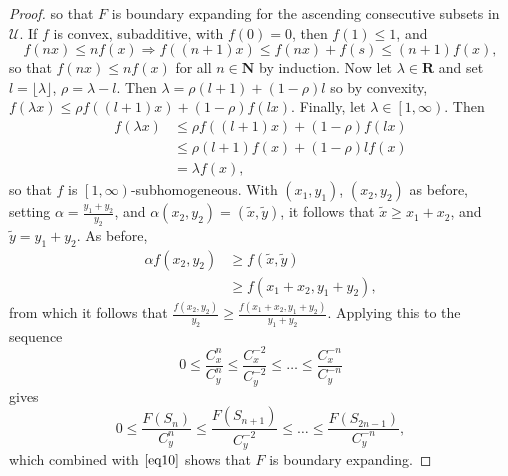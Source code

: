 \documentclass{article}
\theoremstyle{case}
\begin{document}
\begin{proof}
so that $F$ is boundary expanding for the ascending consecutive subsets in $\mathcal{U}$. If $f$ is convex, subadditive, with $f(0) = 0$, then $f(1) \leq 1$, and 
\[
f(nx) \leq nf(x) \Rightarrow f((n+1)x) \leq f(nx) + f(s) \leq (n+1)f(x),
\]
so that $f(nx) \leq nf(x)$ for all $n \in \mathbf{N}$ by induction. Now let $\lambda \in \mathbf{R}$ and set $l = \lfloor \lambda \rfloor$, $\rho = \lambda - l$. Then $\lambda = \rho(l+1) + (1-\rho)l$ so by convexity, $f(\lambda x) \leq \rho f((l+1)x) + (1-\rho)f(lx)$.
Finally, let $\lambda \in \left[1, \infty\right)$. Then
\begin{align*}
f(\lambda x) &\leq \rho f((l+1)x) + (1-\rho)f(lx) \\
&\leq \rho(l+1)f(x) + (1 - \rho)lf(x) \\
&= \lambda f(x),
\end{align*}
so that $f$ is $\left[1,\infty\right)$-subhomogeneous. With $(x_1,y_1)$, $(x_2,y_2)$ as before, setting $\alpha = \frac{y_1+y_2}{y_2}$, and $\alpha(x_2, y_2) = (\tilde{x}, \tilde{y})$, it follows that $\tilde{x} \geq x_1+ x_2$, and $\tilde{y} = y_1 + y_2$.  As before,
\begin{align*}
\alpha f(x_2, y_2) &\geq f(\tilde{x}, \tilde{y}) \\
&\geq f(x_1 + x_2,y_1 + y_2),
\end{align*} 
from which it follows that $\frac{f(x_2,y_2)}{y_2} \geq \frac{f(x_1 + x_2, y_1 + y_2)}{y_1 + y_2}$. Applying this to the sequence
\[
0 \leq \frac{C_x^n}{C_y^n} \leq \frac{C_x^{-2}}{C_y^{-2}} \leq \dots \leq \frac{C_x^{-n}}{C_y^{-n}}
\]
gives
\[
0 \leq \frac{F(S_n)}{C_y^n} \leq \frac{F(S_{n+1})}{C_y^{-2}} \leq \dots \leq \frac{F(S_{2n-1})}{C_y^{-n}},
\]
which combined with $\ref{eq10}$ shows that $F$ is boundary expanding. 


\end{proof}
\end{document}
